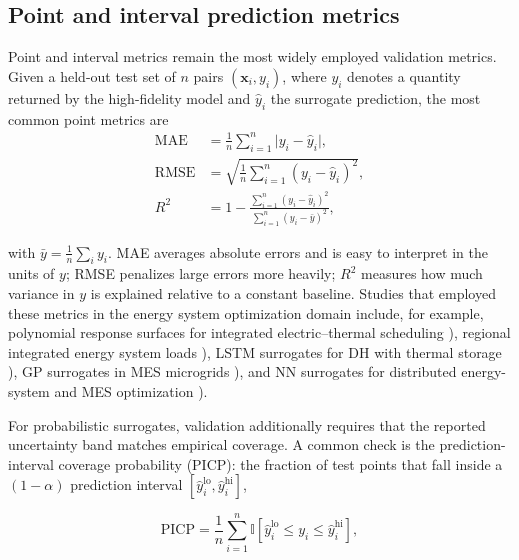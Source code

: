 \subsection{Point and interval prediction metrics}
\label{sec:val:point}

Point and interval metrics remain the most widely employed validation
metrics. Given a held-out test set of $n$ pairs $(\mathbf{x}_i, y_i)$,
where $y_i$ denotes a quantity returned by the high-fidelity model and
$\hat{y}_i$ the surrogate prediction, the most common point metrics are
$$\begin{align}
  \mathrm{MAE}  &= \frac{1}{n}\sum_{i=1}^{n}\lvert y_i - \hat{y}_i\rvert,
  \label{eq:mae} \\
  \mathrm{RMSE} &= \sqrt{\frac{1}{n}\sum_{i=1}^{n}(y_i - \hat{y}_i)^2},
  \label{eq:rmse} \\
  R^{2}         &= 1 - \frac{\sum_{i=1}^{n}(y_i - \hat{y}_i)^2}
                       {\sum_{i=1}^{n}(y_i - \bar{y})^2},
  \label{eq:r2}
\end{align}$$

with $\bar{y} = \frac{1}{n}\sum_i y_i$. MAE averages absolute errors and
is easy to interpret in the units of $y$; RMSE penalizes large errors
more heavily; $R^{2}$ measures how much variance in $y$ is explained
relative to a constant baseline. Studies that employed these metrics in
the energy system optimization domain include, for example, polynomial
response surfaces for integrated electric--thermal scheduling
\cite{Wang2020202933}), regional integrated energy system loads
\cite{Shi2024__2}), LSTM surrogates for DH with thermal storage \cite{Du2025}),
GP surrogates in MES microgrids \cite{Li2023__3}), and NN surrogates for
distributed energy-system and MES optimization
\cite{Perera2019191,Ren2024}).

For probabilistic surrogates, validation additionally requires that the
reported uncertainty band matches empirical coverage. A common check is
the prediction-interval coverage probability (PICP): the fraction of
test points that fall inside a $(1-\alpha)$ prediction interval
$[\hat{y}_i^{\mathrm{lo}},
\hat{y}_i^{\mathrm{hi}}]$,

$$\begin{equation}
  \mathrm{PICP} = \frac{1}{n}\sum_{i=1}^{n}
  \mathbb{I}\!\left[\hat{y}_i^{\mathrm{lo}} \le y_i \le
  \hat{y}_i^{\mathrm{hi}}\right],
  \label{eq:picp}
\end{equation}$$

